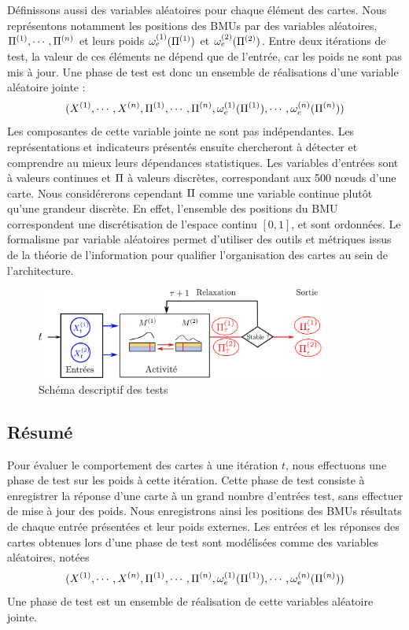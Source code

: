 Définissons aussi des variables aléatoires pour chaque élément des cartes.
Nous représentons notamment les positions des BMUs par des variables aléatoires, $\Pi^{({1})}, \cdots, \Pi^{({n})}$ et leurs poids $\omega_{e}^{({1})}(\Pi^{({1})})$ et $\omega_{e}^{({2})}(\Pi^{({2})})$. Entre deux itérations de test, la valeur de ces éléments ne dépend que de l'entrée, car les poids ne sont pas mis à jour. 
Une phase de test est donc un ensemble de réalisations d'une variable aléatoire jointe : 
$$(X^{({1})}, \cdots, X^{({n})}, \Pi^{({1})}, \cdots, \Pi^{({n})}, \omega_e^{({1})}(\Pi^{({1})}), \cdots, \omega_e^{({n})}(\Pi^{({n})}))$$
Les composantes de cette variable jointe ne sont pas indépendantes. Les représentations et indicateurs présentés ensuite chercheront à détecter et comprendre au mieux leurs dépendances statistiques.
Les variables d'entrées sont à valeurs continues et $\Pi$ à valeurs discrètes, correspondant aux 500 n\oe{}uds d'une carte. Nous considérerons cependant $\Pi$ comme une variable continue plutôt qu'une grandeur discrète. En effet, l'ensemble des positions du BMU correspondent une discrétisation de l'espace continu $[0,1]$, et sont ordonnées.
Le formalisme par variable aléatoires permet d'utiliser des outils et métriques issus de la théorie de l'information pour qualifier l'organisation des cartes au sein de l'architecture.

\begin{figure}
\centering
\includegraphics[width=0.85\textwidth]{tests_2maps.pdf}
\caption{Schéma descriptif des tests}
\label{fig:flowchart}
\end{figure}

\subsection{Résumé}
Pour évaluer le comportement des cartes à une itération $t$, nous effectuons une phase de test sur les poids à cette itération. Cette phase de test consiste à enregistrer la réponse d'une carte à un grand nombre d'entrées test, sans effectuer de mise à jour des poids. Nous enregistrons ainsi les positions des BMUs résultats de chaque entrée présentées et leur poids externes.
Les entrées et les réponses des cartes obtenues lors d'une phase de test sont modélisées comme des variables aléatoires, notées
$$(X^{({1})}, \cdots, X^{({n})}, \Pi^{({1})}, \cdots, \Pi^{({n})}, \omega_e^{({1})}(\Pi^{({1})}), \cdots, \omega_e^{({n})}(\Pi^{({n})}))$$
Une phase de test est un ensemble de réalisation de cette variables aléatoire jointe.

